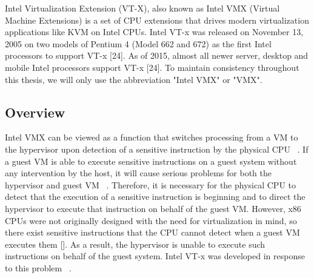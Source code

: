 \documentclass{report}
\begin{document}
\begin{spacing}{1.5}
{\large
Intel Virtualization Extension (VT-X), also known as Intel VMX (Virtual Machine Extensions) is a set of CPU extensions that drives modern virtualization applications like KVM on Intel CPUs. Intel VT-x was released on November 13, 2005 on two models of Pentium 4 (Model 662 and 672) as the first Intel processors to support VT-x [24]. As of 2015, almost all newer server, desktop and mobile Intel processors support VT-x [24]. To maintain consistency throughout this thesis, we will only use the abbreviation "Intel VMX" or "VMX".
\newline
}


\subsection{Overview}

{\large
Intel VMX can be viewed as a function that switches processing from a VM to the hypervisor upon detection of a sensitive instruction by the physical CPU ~\cite{goto2011kernel}. If a guest VM is able to execute sensitive instructions on a guest system without any intervention by the host, it will cause serious problems for both the hypervisor and guest VM ~\cite{goto2011kernel}. Therefore, it is necessary for the physical CPU to detect that the execution of a sensitive instruction is beginning and to direct the hypervisor to execute that instruction on behalf of the guest VM. However, x86 CPUs were not originally designed with the need for virtualization in mind, so there exist sensitive instructions that the CPU cannot detect when a guest VM executes them []. As a result, the hypervisor is unable to execute such instructions on behalf of the guest system. Intel VT-x was developed in response to this problem ~\cite{goto2011kernel}.
\newline
}


\end{spacing}
\end{document}
